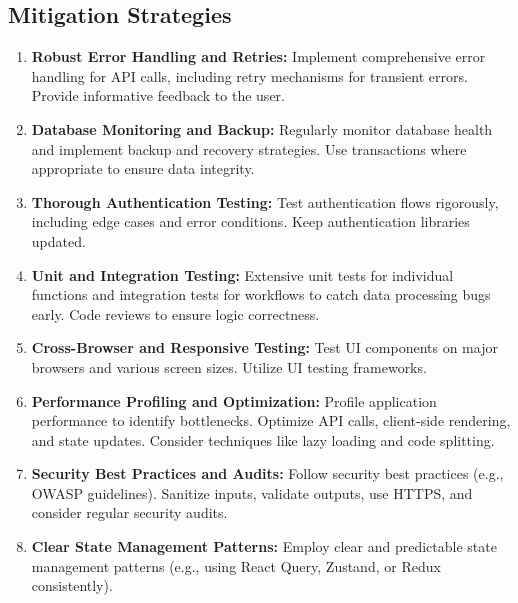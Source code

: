 \documentclass{article}
\begin{document}
\subsection{Mitigation Strategies}
\begin{enumerate}[label=\textbf{M\arabic*.}, itemsep=5pt]
    \item \textbf{Robust Error Handling and Retries:} Implement comprehensive error handling for API calls, including retry mechanisms for transient errors. Provide informative feedback to the user.
    \item \textbf{Database Monitoring and Backup:} Regularly monitor database health and implement backup and recovery strategies. Use transactions where appropriate to ensure data integrity.
    \item \textbf{Thorough Authentication Testing:} Test authentication flows rigorously, including edge cases and error conditions. Keep authentication libraries updated.
    \item \textbf{Unit and Integration Testing:} Extensive unit tests for individual functions and integration tests for workflows to catch data processing bugs early. Code reviews to ensure logic correctness.
    \item \textbf{Cross-Browser and Responsive Testing:} Test UI components on major browsers and various screen sizes. Utilize UI testing frameworks.
    \item \textbf{Performance Profiling and Optimization:} Profile application performance to identify bottlenecks. Optimize API calls, client-side rendering, and state updates. Consider techniques like lazy loading and code splitting.
    \item \textbf{Security Best Practices and Audits:} Follow security best practices (e.g., OWASP guidelines). Sanitize inputs, validate outputs, use HTTPS, and consider regular security audits.
    \item \textbf{Clear State Management Patterns:} Employ clear and predictable state management patterns (e.g., using React Query, Zustand, or Redux consistently).
\end{enumerate}
\end{document}
